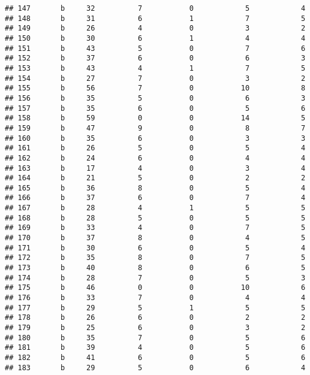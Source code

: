 \documentclass[
]{article}
\begin{document}
\begin{verbatim}
## 147       b     32          7           0            5            4
## 148       b     31          6           1            7            5
## 149       b     26          4           0            3            2
## 150       b     30          6           1            4            4
## 151       b     43          5           0            7            6
## 152       b     37          6           0            6            3
## 153       b     43          4           1            7            5
## 154       b     27          7           0            3            2
## 155       b     56          7           0           10            8
## 156       b     35          5           0            6            3
## 157       b     35          6           0            5            6
## 158       b     59          0           0           14            5
## 159       b     47          9           0            8            7
## 160       b     35          6           0            3            3
## 161       b     26          5           0            5            4
## 162       b     24          6           0            4            4
## 163       b     17          4           0            3            4
## 164       b     21          5           0            2            2
## 165       b     36          8           0            5            4
## 166       b     37          6           0            7            4
## 167       b     28          4           1            5            5
## 168       b     28          5           0            5            5
## 169       b     33          4           0            7            5
## 170       b     37          8           0            4            5
## 171       b     30          6           0            5            4
## 172       b     35          8           0            7            5
## 173       b     40          8           0            6            5
## 174       b     28          7           0            5            3
## 175       b     46          0           0           10            6
## 176       b     33          7           0            4            4
## 177       b     29          5           1            5            5
## 178       b     26          6           0            2            2
## 179       b     25          6           0            3            2
## 180       b     35          7           0            5            6
## 181       b     39          4           0            5            6
## 182       b     41          6           0            5            6
## 183       b     29          5           0            6            4

\end{verbatim}
\end{document}
